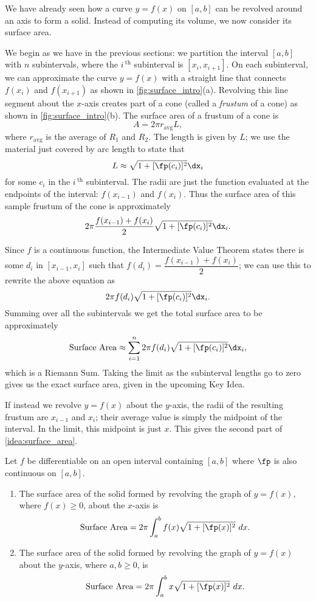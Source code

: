 We have already seen how a curve $y=f(x)$ on $[a,b]$ can be revolved around an axis to form a solid. Instead of computing its volume, we now consider its surface area.

We begin as we have in the previous sections: we partition the interval $[a,b]$ with $n$ subintervals, where the $i\,^{\text{th}}$ subinterval is $[x_i,x_{i+1}]$. On each subinterval, we can approximate the curve $y=f(x)$ with a straight line that connects $f(x_i)$ and $f(x_{i+1})$ as shown in \autoref{fig:surface_intro}(a). Revolving this line segment about the $x$-axis creates part of a cone (called a \textit{frustum} of a cone) as shown in \autoref{fig:surface_intro}(b). The surface area of a frustum of a cone is
\[A=2\pi r_{\text{avg}} L,\]
where $r_{\text{avg}}$ is the average of $R_1$ and $R_2$.  The length is given by $L$; we use the material just covered by arc length to state that
\[L\approx \sqrt{1+[\fp(c_i)]^2}\dx_i\]
for some $c_i$ in the $i\,^\text{th}$ subinterval. The radii are just the function evaluated at the endpoints of the interval: $f(x_{i-1})$ and $f(x_i)$. Thus the surface area of this sample frustum of the cone is approximately 
\[2\pi\frac{f(x_{i-1})+f(x_i)}2\sqrt{1+[\fp(c_i)]^2}\dx_i.\]

Since $f$ is a continuous function, the Intermediate Value Theorem states there is some $d_i$ in $[x_{i-1},x_i]$ such that $f(d_i)=\dfrac{f(x_{i-1})+f(x_i)}2$; we can use this to rewrite the above equation as
\[2\pi f(d_i)\sqrt{1+[\fp(c_i)]^2}\dx_i.\]
Summing over all the subintervals we get the total surface area to be approximately 
\[\text{Surface Area}\approx \sum_{i=1}^n 2\pi f(d_i)\sqrt{1+[\fp(c_i)]^2}\dx_i,\]
which is a Riemann Sum. Taking the limit as the subinterval lengths go to zero gives us the exact surface area, given in the upcoming Key Idea.

If instead we revolve $y=f(x)$ about the $y$-axis, the radii of the resulting frustum are $x_{i-1}$ and $x_i$; their average value is simply the midpoint of the interval. In the limit, this midpoint is just $x$. This gives the second part of \autoref{idea:surface_area}.

{Let $f$ be differentiable on an open interval containing $[a,b]$ where $\fp$ is also continuous on $[a,b]$. 
\begin{enumerate}
	\item	The surface area of the solid formed by revolving the graph of $y=f(x)$, where $f(x)\geq0$, about the $x$-axis is
	\[\text{Surface Area} = 2\pi\int_a^b f(x)\sqrt{1+[\fp(x)]^2}\ dx.\]
	\item	The surface area of the solid formed by revolving the graph of $y=f(x)$ about the $y$-axis, where $a,b\geq0$, is
	\[\text{Surface Area} = 2\pi\int_a^b x\sqrt{1+[\fp(x)]^2}\ dx.\]
\end{enumerate}}

